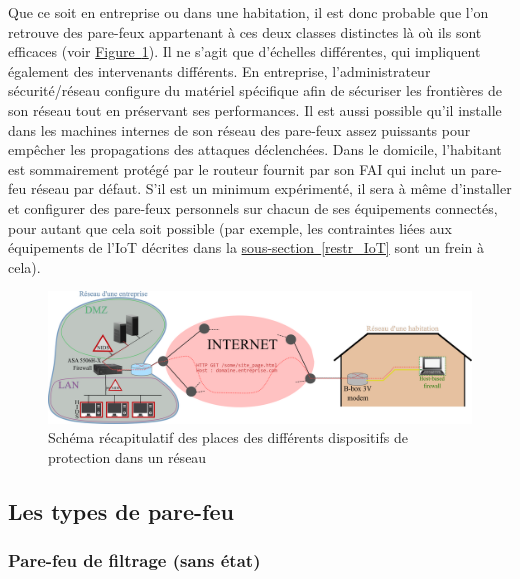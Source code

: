 \documentclass[]{article}
\newcommand{\wordlink}[2]{\hyperref[#1]{#2~\ref{#1}}}
\begin{document}
\newpage

\par Que ce soit en entreprise ou dans une habitation, il est donc probable que l'on retrouve des pare-feux appartenant à ces deux classes distinctes là où ils sont efficaces (voir  \wordlink{netw_IDS}{Figure}). Il ne s'agit que d'échelles différentes, qui impliquent également des intervenants différents. En entreprise, l'administrateur sécurité/réseau configure du matériel spécifique afin de sécuriser les frontières de son réseau tout en préservant ses performances. Il est aussi possible qu'il installe dans les machines internes de son réseau des pare-feux assez puissants pour empêcher les propagations des attaques déclenchées. Dans le domicile, l'habitant est sommairement protégé par le routeur fournit par son FAI qui inclut un pare-feu réseau par défaut. S'il est un minimum expérimenté, il sera à même d'installer et configurer des pare-feux personnels sur chacun de ses équipements connectés, pour autant que cela soit possible (par exemple, les contraintes liées aux équipements de l'IoT décrites dans la \wordlink{restr_IoT}{sous-section} sont un  frein à cela).   


\begin{figure}[!h]
\centering
\includegraphics[scale=1.65]{netw_IDS.png}
\caption{Schéma récapitulatif des places des différents dispositifs de protection dans un réseau}
\label{netw_IDS}
\end{figure}

\subsection{Les types de pare-feu}

\subsubsection{Pare-feu de filtrage (sans état)}
\end{document}

